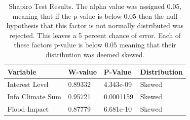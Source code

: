 \begin{table}[h]
    \centering
    \begin{tabular}{|l|l|l|l|}
    \hline
         Variable & W-value & P-Value & Distribution \\ \hline
       Interest Level & 0.89332 & 4.343e-09 & Skewed \\ \hline
         Info Climate Sum  & 0.95721 & 0.0001159 & Skewed \\ \hline
        Flood Impact & 0.87779 & 6.681e-10 & Skewed \\ \hline
     \end{tabular}
    \caption{Shapiro Test Results. The alpha value was assigned 0.05, meaning that if the p-value is below 0.05 then the null hypothesis that this factor is not normally distributed was rejected. This leaves a 5 percent chance of error. Each of these factors p-value is below 0.05 meaning that their distribution was deemed skewed.}
    \label{table:shapiro_test_results}
\end{table}



